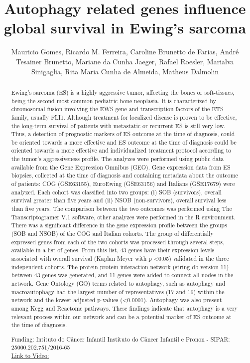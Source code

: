 \documentclass[twoside]{article}
\title{\vspace{-15mm}\fontsize{24pt}{10pt}\selectfont\textbf{ Autophagy related genes influence global survival in Ewing's sarcoma }} %
\author{ Mauricio Gomes,  Ricardo M. Ferreira,  Caroline Brunetto de Farias,  Andr\'e Tesainer Brunetto,  Mariane da Cunha Jaeger,  Rafael Roesler,  Marialva Sinigaglia,  Rita Maria Cunha de Almeida,  Matheus Dalmolin }
\affil{ UFRGS,  UFRGS,  ICI - Instituto do C\^ancer Infantil }
\date{}
\begin{document}
  
  
  \maketitle %
  
  
  \thispagestyle{fancy} %
  
  
  \begin{abstract}
  Ewing's sarcoma (ES) is a highly aggressive tumor,  affecting the bones or soft-tissues,  being the second most common pediatric bone neoplasia. It is characterized by chromosomal fusion involving the EWS gene and transcription factors of the ETS family,  usually FLI1. Although treatment for localized disease is proven to be effective,  the long-term survival of patients with metastatic or recurrent ES is still very low. Thus,  a detection of prognostic markers of ES outcome at the time of diagnosis,  could be oriented towards a more effective and
ES outcome at the time of diagnosis could be oriented towards a more effective and individualized treatment protocol according to the tumor's aggressiveness profile.
The analyzes were performed using public data available from the Gene Expression Omnibus (GEO). Gene expression data from ES biopsies,  collected at the time of diagnosis and containing metadata about the outcome of patients: COG (GSE63155),  EuroEwing (GSE63156) and Italians (GSE17679) were analyzed. Each cohort was classified into two groups: (i) SOB (survivors),  overall survival greater than five years and (ii) NSOB (non-survivors),  overall survival less than five years. The comparison between the two outcomes was performed using The Transcriptogramer V.1 software,  other analyzes were performed in the R environment.
There was a significant difference in the gene expression profile between the groups (SOB and NSOB) of the COG and Italian cohorts. The group of differentially expressed genes from each of the two cohorts was processed through several steps,  available in a list of genes. From this list,  43 genes have their expression levels associated with overall survival (Kaplan Meyer with p <0.05) validated in the three independent cohorts. The protein-protein interaction network (string-db version 11) between 43 genes was generated,  and 11 genes were added to connect all nodes in the network. Gene Ontology (GO) terms related to autophagy,  such as autophagy and macroautophagy had the largest number of representatives (17 and 16) within the network and the lowest adjusted p-values (<0.0001). Autophagy was also present among Kegg and Reactome pathways. These findings indicate that autophagy is a very relevant process within our network and can be a potential marker of ES outcome at the time of diagnosis.
  
  Funding: Intituto do C\^ancer Infantil Instituto do C\^ancer Infantil e Pronon - SIPAR: 25000.202.751/2016-65 \\
  \href{http://ab3c.org.br/xpress_pres2020/xmxp2020-305749.html}{Link to Video:}

  \end{abstract}
   
  
\end{document}
